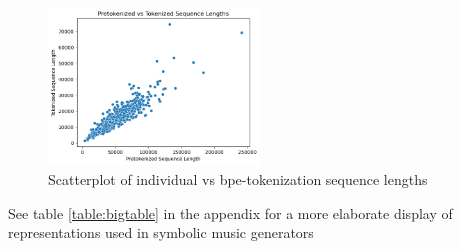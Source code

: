 \begin{figure}[H]
    \centering
    \includegraphics[width=0.5\textwidth]{IMAGES/scatter_pre_post_tok.png} 
    \caption{Scatterplot of individual vs bpe-tokenization sequence lengths}
    \label{fig:tok_compare}
\end{figure}



See table \ref{table:bigtable} in the appendix for a more elaborate display of representations used in symbolic music generators

\cite{Herremans_Chew_Morpheus_2019} 


